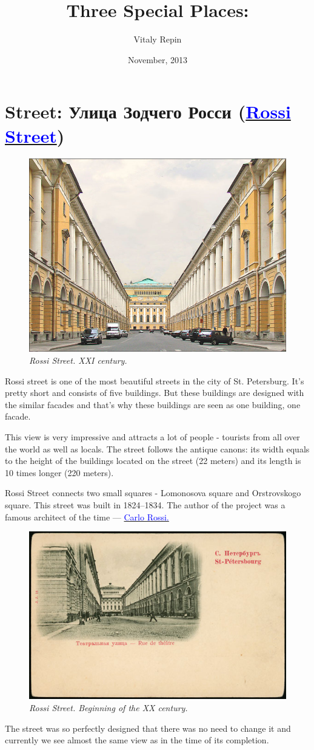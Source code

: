 \documentclass[a4paper]{article}
\author{Vitaly Repin}
\title{Three Special Places: \emph{\mycity}}
\date{November, 2013}
\newcommand{\myhref}[2]{{\href{#1}{\textcolor{blue}{#2}}}}
\begin{document}
{\section{Street: Улица Зодчего Росси (\myhref{http://goo.gl/maps/C3ZED}{Rossi Street})}
\begin{figure}
\includegraphics[keepaspectratio,width=.5\textwidth]{Rossi1}
\textit{Rossi Street. XXI century.}
\end{figure}

Rossi street is one of the most beautiful streets in the city of St. Petersburg. It's pretty short and
consists of five buildings. But these buildings are designed with
the similar facades and that's why these buildings are seen as one building, one facade.

This view is very impressive and attracts a lot of people - tourists from all over the world as well as locals.
The street follows the antique canons: its width equals to the height of the buildings located on the street (22 meters) and its length is 10 times longer (220 meters).

Rossi Street connects two small squares - Lomonosova square and Orstrovskogo square.
This street was built in 1824--1834. The author of the project was a famous architect of the time ---
\myhref{http://en.wikipedia.org/wiki/Carlo_Rossi_(architect)}{Carlo Rossi.}

\begin{figure}
\vspace*{-.5cm}
\includegraphics[keepaspectratio,width=.5\textwidth]{Rossi2}
\textit{Rossi Street. Beginning of the XX century.}
\end{figure}
The street was so perfectly designed that
there was no need to change it and currently we see almost the same view as in the time of its completion.

}
\end{document}
